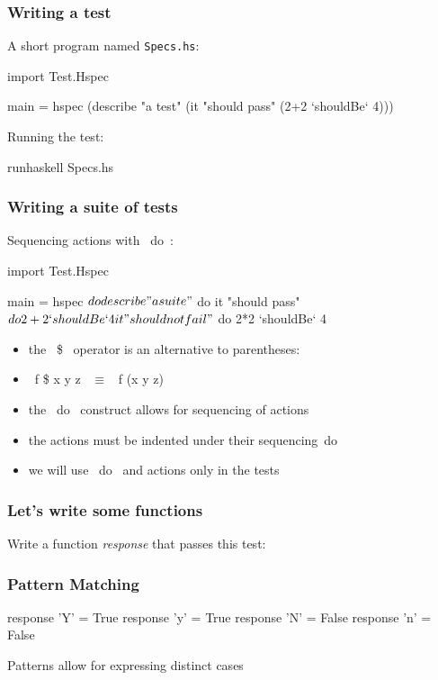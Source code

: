 \documentclass[12pt,xcolor={dvipsnames}]{beamer}
\newcommand{\tc}{\textcolor}
\newcommand{\key}[1]{\tc{orange}{#1}}
\newcommand{\rk}{\enskip{\key{$\hookleftarrow$}}}
\newcommand{\vs}{\vspace{1em}}
\begin{document}
\begin{frame}[fragile]
\frametitle{Writing a test}

A short program named \texttt{Specs.hs}:
\begin{haskell}[frame=single]
import Test.Hspec

main = hspec 
(describe "a test" 
 (it "should pass" 
  (2+2  `shouldBe` 4)))
\end{haskell}
\vs
Running the test:
\begin{term}
runhaskell Specs.hs\rk
\end{term}
\end{frame}
\begin{frame}[fragile]
\frametitle{Writing a suite of tests}
Sequencing actions with ~do~:
\begin{haskell}

import Test.Hspec

main = hspec $ do
    describe "a suite" $ do
        it "should pass" $ do
            2+2  `shouldBe` 4
        it "should not fail" $ do
            2*2 `shouldBe` 4
\end{haskell}
\begin{itemize}
\item the ~\$~ operator is an alternative to parentheses:
\item ~f \$ x y z~ $\equiv$ ~f (x y z)~
\item the ~do~ construct allows for sequencing of actions
\item the actions must be indented under their sequencing~do~ 
\item we will use ~do~ and actions only in the tests
\end{itemize}
\end{frame}
\begin{frame}[fragile]
\frametitle{Let's write some functions}
Write a function \emph{response} that passes this test:
\end{frame}
\begin{frame}[fragile]
\frametitle{Pattern Matching}
\begin{haskell}
response 'Y' = True
response 'y' = True
response 'N' = False
response 'n' = False
\end{haskell}
\vs
Patterns allow for expressing distinct cases 
\end{frame}
\end{document}
